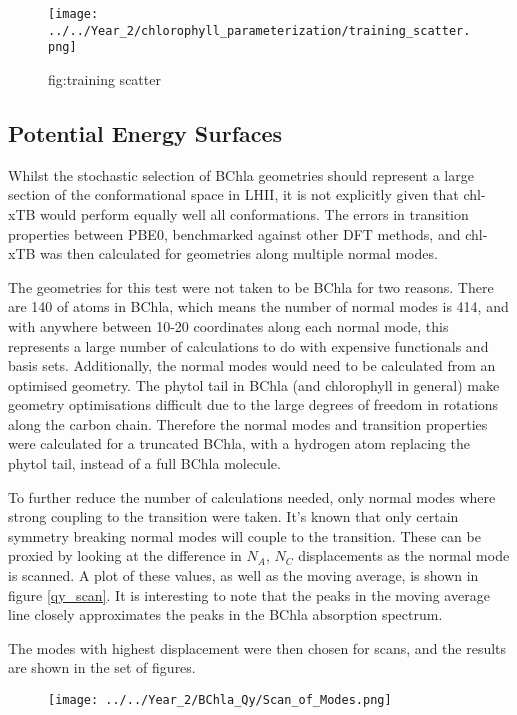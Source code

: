 \begin{figure}
    \texttt{[image: ../../Year\_2/chlorophyll\_parameterization/training\_scatter.png]}
    \caption{fig:training scatter}
\end{figure}

\subsection{Potential Energy Surfaces}
\label{subsec:pot_energy_surfaces}

Whilst the stochastic selection of BChla geometries should represent a large section 
of the conformational space in LHII, it is not explicitly given that chl-xTB would
perform equally well all conformations. The errors in transition properties between
PBE0, benchmarked against other DFT methods, and chl-xTB was then calculated for
geometries along multiple normal modes.

The geometries for this test were not taken to be BChla for two reasons. There are
140 of atoms in BChla, which means the number of normal modes is 414, and with
anywhere between 10-20 coordinates along each normal mode, this represents a large
number of calculations to do with expensive functionals and basis sets. Additionally,
the normal modes would need to be calculated from an optimised geometry. The phytol
tail in BChla (and chlorophyll in general) make geometry optimisations difficult
due to the large degrees of freedom in rotations along the carbon chain. Therefore
the normal modes and transition properties were calculated for a truncated BChla, 
with a hydrogen atom replacing the phytol tail, instead of a full BChla molecule.

To further reduce the number of calculations needed, only normal modes where strong
coupling to the \Qy transition were taken. It's known that only certain symmetry 
breaking normal modes will couple to the \Qy transition. These can be proxied
by looking at the difference in $N_A$, $N_C$ displacements as the normal mode
is scanned. A plot of these values, as well as the moving average, is shown in figure
\ref{qy_scan}. It is interesting to note that the peaks in the moving average line
closely approximates the peaks in the BChla absorption spectrum.

The modes with highest displacement were then chosen for scans, and the results
are shown in the set of figures.


\begin{figure}
    \texttt{[image: ../../Year\_2/BChla\_Qy/Scan\_of\_Modes.png]}
    \label{fig:qy_scan}
\end{figure}

